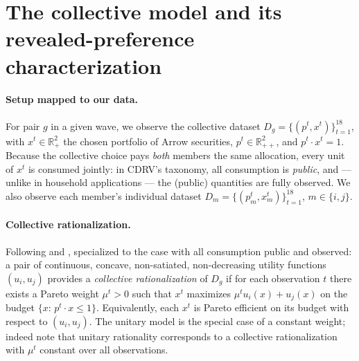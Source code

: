 \documentclass[11pt]{article}
\theoremstyle{remark}
\newcommand{\R}{\mathbb{R}}
\begin{document}
\section{The collective model and its revealed-preference characterization}\label{sec:cdrv}

\paragraph{Setup mapped to our data.}
For pair $g$ in a given wave, we observe the collective dataset $D_g=\{(p^t,x^t)\}_{t=1}^{18}$, with $x^t\in\R^2_+$ the chosen portfolio of Arrow securities, $p^t\in\R^2_{++}$, and $p^t\cdot x^t=1$. Because the collective choice pays \emph{both} members the same allocation, every unit of $x^t$ is consumed jointly: in CDRV's taxonomy, all consumption is \emph{public}, and --- unlike in household applications --- the (public) quantities are fully observed. We also observe each member's individual dataset $D_m=\{(p^t_m,x^t_m)\}_{t=1}^{18}$, $m\in\{i,j\}$.

\paragraph{Collective rationalization.}
Following \citet[Def.~1]{cherchye2007} and \citet[Def.~2]{cherchye2011}, specialized to the case with all consumption public and observed: a pair of continuous, concave, non-satiated, non-decreasing utility functions $(u_i,u_j)$ provides a \emph{collective rationalization} of $D_g$ if for each observation $t$ there exists a Pareto weight $\mu^t>0$ such that $x^t$ maximizes $\mu^t u_i(x)+u_j(x)$ on the budget $\{x:\,p^t\cdot x\le 1\}$. Equivalently, each $x^t$ is Pareto efficient on its budget with respect to $(u_i,u_j)$. The unitary model is the special case of a constant weight; indeed \citet[fn.~4]{cherchye2007} note that unitary rationality corresponds to a collective rationalization with $\mu^t$ constant over all observations.
\end{document}
